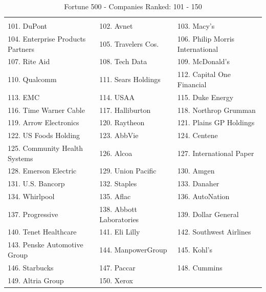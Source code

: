 \documentclass{article}
\begin{document}
\begin{table}[H]
\centering
\caption{Fortune 500 - Companies Ranked: 101 - 150}
\begin{tabular}{lll}
\hline
 \\ 101. DuPont 
&  102. Avnet 
&  103. Macy's 
\\ 104. Enterprise Products Partners 
&  105. Travelers Cos. 
&  106. Philip Morris International 
\\ 107. Rite Aid 
&  108. Tech Data 
&  109. McDonald's 
\\ 110. Qualcomm 
&  111. Sears Holdings 
&  112. Capital One Financial 
\\ 113. EMC 
&  114. USAA 
&  115. Duke Energy 
\\ 116. Time Warner Cable 
&  117. Halliburton 
&  118. Northrop Grumman 
\\ 119. Arrow Electronics 
&  120. Raytheon 
&  121. Plains GP Holdings 
\\ 122. US Foods Holding 
&  123. AbbVie 
&  124. Centene 
\\ 125. Community Health Systems 
&  126. Alcoa 
&  127. International Paper 
\\ 128. Emerson Electric 
&  129. Union Pacific 
&  130. Amgen 
\\ 131. U.S. Bancorp 
&  132. Staples 
&  133. Danaher 
\\ 134. Whirlpool 
&  135. Aflac 
&  136. AutoNation 
\\ 137. Progressive 
&  138. Abbott Laboratories 
&  139. Dollar General 
\\ 140. Tenet Healthcare 
&  141. Eli Lilly 
&  142. Southwest Airlines 
\\ 143. Penske Automotive Group 
&  144. ManpowerGroup 
&  145. Kohl's 
\\ 146. Starbucks 
&  147. Paccar 
&  148. Cummins 
\\ 149. Altria Group 
&  150. Xerox 
 &
 \\ \hline

\end{tabular}
\end{table}
\end{document}

